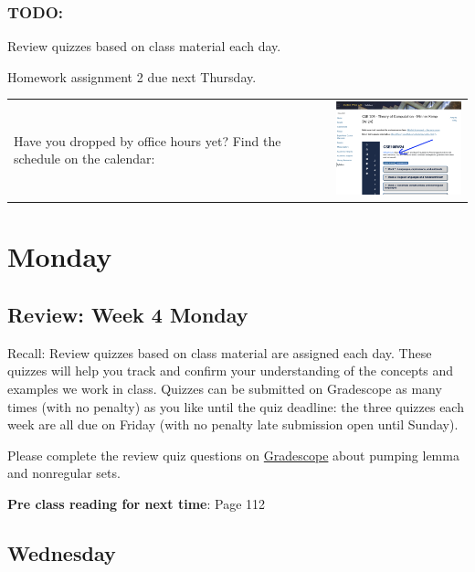 \subsubsection*{TODO:}
\begin{list}
   {\itemsep2pt}
   \item Review quizzes based on class material each day. 
   \item Homework assignment 2 due next Thursday.
   \item \begin{tabular}{p{4in}c}
    Have you dropped by office hours yet? Find the schedule on the calendar: &   
   \includegraphics[width=2in]{../../resources/images/officehourslink.png}
   \end{tabular}
\end{list}

\newpage

\section*{Monday}


    
\subsection*{Review: Week 4 Monday}


Recall: Review quizzes based on class material are assigned each day. 
These quizzes will help you track and confirm your understanding of the concepts and examples 
we work in class. Quizzes can be submitted on Gradescope as many times (with no penalty) as 
you like until the quiz deadline: the three quizzes each week are all due on Friday (with no penalty 
late submission open until Sunday).

Please complete the review quiz questions on \href{http://gradescope.com}{Gradescope} about 
pumping lemma and nonregular sets.

{\bf Pre class reading for next time}: Page 112


\newpage
\subsection*{Wednesday}

